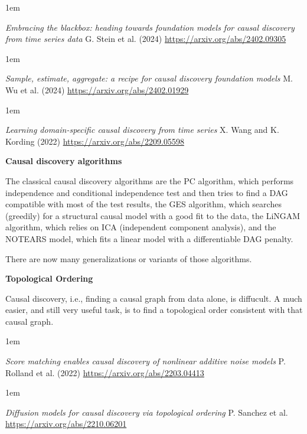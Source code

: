 \documentclass[a5paper]{article}
\newenvironment{reference}{%
  \medskip\goodbreak
  \parskip 0pt
  \raggedright
  \leftskip 1em
  \obeylines
}{\par\medskip\goodbreak}
\def\subsection#1{{\par\bigskip\goodbreak\large\bfseries #1\par}}
\begin{document}
\begin{reference}
  \emph{Embracing the blackbox:  heading towards foundation models  for causal discovery from time series data}
  G. Stein et al. (2024)
  \url{https://arxiv.org/abs/2402.09305}
\end{reference}

\begin{reference}
  \emph{Sample, estimate, aggregate: a recipe  for causal discovery foundation models}
  M. Wu et al. (2024)
  \url{https://arxiv.org/abs/2402.01929}
\end{reference}

\begin{reference}
  \emph{Learning domain-specific  causal discovery from time series}
  X. Wang and K. Kording (2022)
  \url{https://arxiv.org/abs/2209.05598}
\end{reference}

\subsection{Causal discovery algorithms}

The classical causal discovery algorithms are
the PC algorithm, which performs independence and conditional independence test
and then tries to find a DAG compatible with most of the test results,
the GES algorithm, which searches (greedily) for a structural causal model with a good fit to the data,
the LiNGAM algorithm, which relies on ICA (independent component analysis),
and the NOTEARS model, which fits a linear model with a differentiable DAG penalty.

There are now many generalizations or variants of those algorithms.

\subsection{Topological Ordering}

Causal discovery, i.e., finding a causal graph from data alone,
is diffucult. A much easier, and still very useful task,
is to find a topological order consistent with that causal graph.

\begin{reference}
  \emph{Score matching enables causal discovery  of nonlinear additive noise models}
  P. Rolland et al. (2022)
  \url{https://arxiv.org/abs/2203.04413}
\end{reference}

\begin{reference}
  \emph{Diffusion models for causal discovery  via topological ordering}
  P. Sanchez et al.
  \url{https://arxiv.org/abs/2210.06201}
\end{reference}
\end{document}
